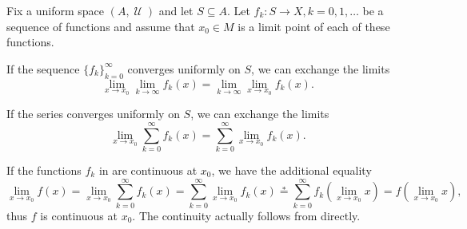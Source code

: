 \begin{theorem}\label{thm:uniform_limit_exchange}\mcite\cite[]{Фихтенгольц1968/2}
  Fix a uniform space \( (A, \mscrU) \) and let \( S \subseteq A \). Let \( f_k: S \to X, k = 0, 1, \ldots \) be a sequence of functions and assume that \( x_0 \in M \) is a limit point of each of these functions.

  \begin{thmenum}
     If the sequence \( \{ f_k \}_{k=0}^\infty \) converges uniformly on \( S \), we can exchange the limits
    \begin{equation*}
      \lim_{x \to x_0} \lim_{k \to \infty} f_k(x)
      =
      \lim_{k \to \infty} \lim_{x \to x_0} f_k(x).
    \end{equation*}

     If the series  converges uniformly on \( S \), we can exchange the limits
    \begin{equation*}
      \lim_{x \to x_0} \sum_{k=0}^\infty f_k(x)
      =
      \sum_{k=0}^\infty \lim_{x \to x_0} f_k(x).
    \end{equation*}
  \end{thmenum}
\end{theorem}

\begin{remark}\label{rem:thm:uniform_limit_exchange_continuity}
  If the functions \( f_k \) in  are continuous at \( x_0 \), we have the additional equality
  \begin{equation}\label{thm:uniform_limit_exchange/continuous_equality}
    \lim_{x \to x_0} f(x)
    =
    \lim_{x \to x_0} \sum_{k=0}^\infty f_k(x)
    =
    \sum_{k=0}^\infty \lim_{x \to x_0} f_k(x)
    \overset * =
    \sum_{k=0}^\infty f_k\left(\lim_{x \to x_0} x \right)
    =
    f\left(\lim_{x \to x_0} x \right),
  \end{equation}
  thus \( f \) is continuous at \( x_0 \). The continuity actually follows from  directly.
\end{remark}

